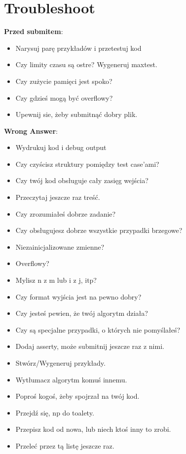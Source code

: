 \section{Troubleshoot}
\footnotesize{
\textbf{Przed submitem}:
\begin{itemize}[noitemsep]
	\item Narysuj parę przykładów i przetestuj kod
	\item Czy limity czasu są ostre? Wygeneruj maxtest.
	\item Czy zużycie pamięci jest spoko?
	\item Czy gdzieś mogą być overflowy? 
	\item Upewnij sie, żeby submitnąć dobry plik.
\end{itemize}

\textbf{Wrong Answer}:
\begin{itemize}[noitemsep]
	\item Wydrukuj kod i debug output
	\item Czy czyścisz struktury pomiędzy test case'ami?
	\item Czy twój kod obsługuje cały zasięg wejścia?
	\item Przeczytaj jeszcze raz treść.
	\item Czy zrozumiałeś dobrze zadanie?
	\item Czy obsługujesz dobrze wszystkie przypadki brzegowe?
	\item Niezainicjalizowane zmienne?
	\item Overflowy?
	\item Mylisz n z m lub i z j, itp?
	\item Czy format wyjścia jest na pewno dobry?
	\item Czy jesteś pewien, że twój algorytm działa?
	\item Czy są specjalne przypadki, o których nie pomyślałeś?
	\item Dodaj asserty, może submitnij jeszcze raz z nimi.
	\item Stwórz/Wygeneruj przykłady.
	\item Wytłumacz algorytm komuś innemu.
	\item Poproś kogoś, żeby spojrzał na twój kod.
	\item Przejdź się, np do toalety.
	\item Przepisz kod od nowa, lub niech ktoś inny to zrobi.
	\item Przeleć przez tą listę jeszcze raz.
\end{itemize}

}
